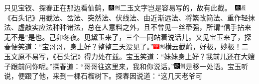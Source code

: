 只见宝钗、探春正在那边看仙鹤，{\includegraphics[width=3mm]{../Images/00004}\includegraphics[width=3mm]{../Images/00011}\footnotesize \kaishu 二玉文字岂是容易写的，故有此截。　\includegraphics[width=3mm]{../Images/00004}\includegraphics[width=3mm]{../Images/00010}\footnotesize \kaishu 《石头记》用截法、岔法、突然法、伏线法、由近渐远法、将繁改简法、重作轻抹法、虚敲实应法种种诸法，总在人意料之外，且不曾见一丝牵强，所谓``信手拈来无不是''是也。己卯冬夜。}见黛玉来了，三个一同站着说话儿。又见宝玉来了，探春便笑道：``宝哥哥，身上好？整整三天没见了。''{\includegraphics[width=3mm]{../Images/00002}\includegraphics[width=3mm]{../Images/00011}\footnotesize \kaishu 横云截岭，好极，妙极！二玉文原不易写，《石头记》得力处在兹。}宝玉笑道：``妹妹身上好？我前儿还在大嫂子跟前问你呢。''探春道：``哥哥往这里来，我和你说话。''{\includegraphics[width=3mm]{../Images/00004}\includegraphics[width=3mm]{../Images/00011}\footnotesize \kaishu 是移一处语。}宝玉听说，便跟了他，来到一棵石榴树下。探春因说道：``这几天老爷可